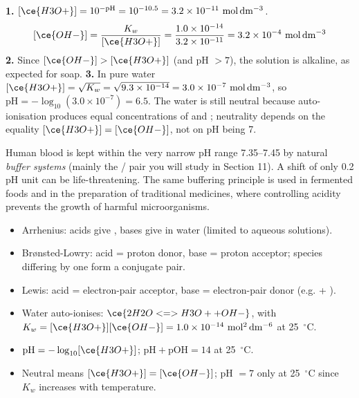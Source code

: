 \documentclass[11pt]{article}
\begin{document}
\begin{corrige}[Exercise 1]
\textbf{1.} $[\ce{H3O+}] = 10^{-\mathrm{pH}} = 10^{-10.5} = 3.2\times 10^{-11}\ \mathrm{mol\,dm^{-3}}$.
\[
[\ce{OH-}] = \frac{K_w}{[\ce{H3O+}]} = \frac{1.0\times 10^{-14}}{3.2\times 10^{-11}} = 3.2\times 10^{-4}\ \mathrm{mol\,dm^{-3}}
\]
\textbf{2.} Since $[\ce{OH-}] > [\ce{H3O+}]$ (and pH $> 7$), the solution is alkaline, as expected for soap.
\textbf{3.} In pure water $[\ce{H3O+}] = \sqrt{K_w} = \sqrt{9.3\times 10^{-14}} = 3.0\times 10^{-7}\ \mathrm{mol\,dm^{-3}}$, so $\mathrm{pH} = -\log_{10}(3.0\times 10^{-7}) = 6.5$. The water is still neutral because auto-ionisation produces equal concentrations of  and ; neutrality depends on the equality $[\ce{H3O+}] = [\ce{OH-}]$, not on pH being 7.
\end{corrige}

\begin{savaistu}
Human blood is kept within the very narrow pH range 7.35--7.45 by natural \emph{buffer systems} (mainly the / pair you will study in Section 11). A shift of only 0.2 pH unit can be life-threatening. The same buffering principle is used in fermented foods and in the preparation of traditional medicines, where controlling acidity prevents the growth of harmful microorganisms.
\end{savaistu}

\begin{aretenir}
\begin{itemize}
\item Arrhenius: acids give , bases give  in water (limited to aqueous solutions).
\item Brønsted-Lowry: acid = proton donor, base = proton acceptor; species differing by one  form a conjugate pair.
\item Lewis: acid = electron-pair acceptor, base = electron-pair donor (e.g.  + ).
\item Water auto-ionises: $\ce{2H2O <=> H3O+ + OH-}$, with $K_w = [\ce{H3O+}][\ce{OH-}] = 1.0\times10^{-14}\ \mathrm{mol^2\,dm^{-6}}$ at \SI{25}{\ensuremath{{}^{\circ}\mathrm{C}}}.
\item $\mathrm{pH} = -\log_{10}[\ce{H3O+}]$; $\mathrm{pH} + \mathrm{pOH} = 14$ at \SI{25}{\ensuremath{{}^{\circ}\mathrm{C}}}.
\item Neutral means $[\ce{H3O+}] = [\ce{OH-}]$; pH $= 7$ only at \SI{25}{\ensuremath{{}^{\circ}\mathrm{C}}} since $K_w$ increases with temperature.
\end{itemize}
\end{aretenir}
\end{document}
